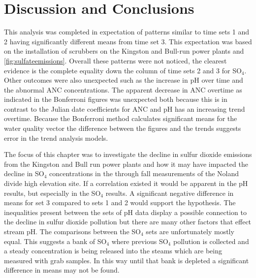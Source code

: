 \section{Discussion and Conclusions}
This analysis was completed in expectation of patterns similar to time sets 1 and 2 having significantly different means from time set 3.
This expectation was based on the installation of scrubbers on the Kingston and Bull-run power plants and \autoref{fig:sulfateemissions}.
Overall these patterns were not noticed, the clearest evidence is the complete equality down the column of time sets 2 and 3 for SO$_4$.
Other outcomes were also unexpected such as the increase in pH over time and the abnormal ANC concentrations.%
The apparent decrease in ANC overtime as indicated in the Bonferroni figures was unexpected both because this is in contrast to the Julian date coefficients for ANC and pH has an increasing trend overtime.
Because the Bonferroni method calculates significant means for the water quality vector the difference between the figures and the trends suggests error in the trend analysis models.

The focus of this chapter was to investigate the decline in sulfur dioxide emissions from the Kingston and Bull run power plants and how it may have impacted the decline in SO$_4$  concentrations in the through fall measurements of the Noland divide high elevation site.
If a correlation existed it would be apparent in the pH results, but especially in the SO$_4$ results.
A significant negative difference in means for set 3 compared to sets 1 and 2 would support the hypothesis.
The inequalities present between the sets of pH data display a possible connection to the decline in sulfur dioxide pollution but there are many other factors that effect stream pH.
The comparisons between the SO$_4$ sets are unfortunately mostly equal.
This suggests a bank of SO$_4$ where previous SO$_4$ pollution is collected and a steady concentration is being released into the steams which are being measured with grab samples.
In this way until that bank is depleted a significant difference in means may not be found.
